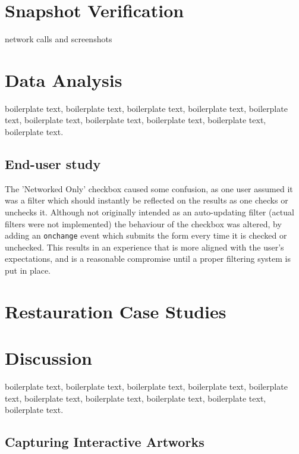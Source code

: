 \section{Snapshot Verification}

\todo network calls and screenshots


\section{Data Analysis}

boilerplate text, boilerplate text, boilerplate text, boilerplate text, boilerplate text, boilerplate text, boilerplate text, boilerplate text, boilerplate text, boilerplate text.

\subsection{End-user study}


The 'Networked Only' checkbox caused some confusion, as one user assumed it was a filter which should instantly be reflected on the results as one checks or unchecks it. Although not originally intended as an auto-updating filter (actual filters were not implemented) the behaviour of the checkbox was altered, by adding an \texttt{onchange} event which submits the form every time it is checked or unchecked. This results in an experience that is more aligned with the user's expectations, and is a reasonable compromise until a proper filtering system is put in place.


\section{Restauration Case Studies}

\todo


\section{Discussion}


boilerplate text, boilerplate text, boilerplate text, boilerplate text, boilerplate text, boilerplate text, boilerplate text, boilerplate text, boilerplate text, boilerplate text.


\subsection{Capturing Interactive Artworks}
\label{subsec:capture-interactive}


